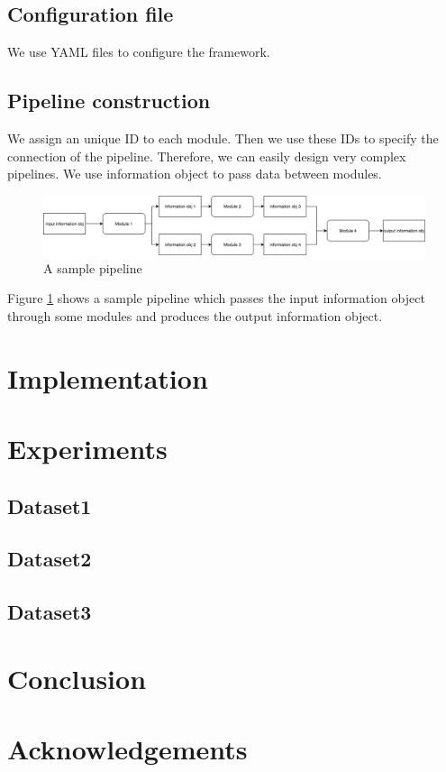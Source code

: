 \documentclass{article}
\begin{document}
    \subsection{Configuration file}
    We use YAML files to configure the framework.

    \subsection{Pipeline construction}
    We assign an unique ID to each module.
    Then we use these IDs to specify the connection of the pipeline.
    Therefore, we can easily design very complex pipelines.
    We use information object to pass data between modules.

    \begin{figure}[H]
        \begin{center}
            \includegraphics[width=1.2\textwidth]{fig/sample_pipeline.png}
        \end{center}
        \label{fig:sample_pipeline}
        \caption{A sample pipeline}
    \end{figure}
    Figure \ref{fig:sample_pipeline} shows a sample pipeline which passes the input information object
    through some modules and produces the output information object.


\section{Implementation}

\section{Experiments}
    \subsection{Dataset1}
    \subsection{Dataset2}
    \subsection{Dataset3}

\section{Conclusion}

\section*{Acknowledgements}
\end{document}
